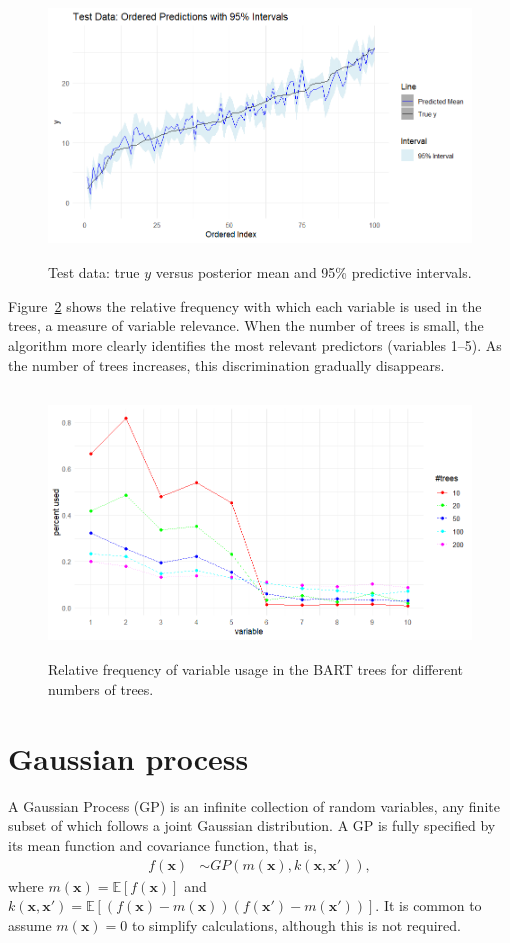 \begin{figure}[!h]
	\centering
	\includegraphics[width=340pt, height=200pt]{Chapters/chapter13/figures/TestPred.png}
	\caption{Test data: true \(y\) versus posterior mean and 95\% predictive intervals.}
	\label{figTestPred}
\end{figure}

Figure~\ref{figRelvVar} shows the relative frequency with which each variable is used in the trees, a measure of variable relevance. When the number of trees is small, the algorithm more clearly identifies the most relevant predictors (variables 1–5). As the number of trees increases, this discrimination gradually disappears.

\begin{figure}[!h]
	\centering
	\includegraphics[width=340pt, height=200pt]{Chapters/chapter13/figures/RelvVar.png}
	\caption{Relative frequency of variable usage in the BART trees for different numbers of trees.}
	\label{figRelvVar}
\end{figure}

\section{Gaussian process}\label{13_4}
A Gaussian Process (GP) is an infinite collection of random variables, any finite subset of which follows a joint Gaussian distribution. A GP is fully specified by its mean function and covariance function, that is,
\begin{align*}
	f(\mathbf{x}) &\sim GP(m(\mathbf{x}), k(\mathbf{x}, \mathbf{x}')),
\end{align*}
where \( m(\mathbf{x}) = \mathbb{E}[f(\mathbf{x})] \) and \( k(\mathbf{x}, \mathbf{x}') = \mathbb{E}[(f(\mathbf{x}) - m(\mathbf{x}))(f(\mathbf{x}') - m(\mathbf{x}'))] \).  
It is common to assume \( m(\mathbf{x}) = 0 \) to simplify calculations, although this is not required.


